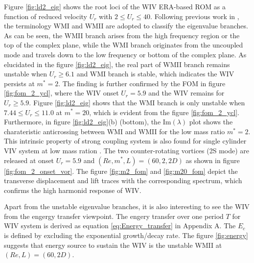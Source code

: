 Figure \ref{fig:ld2_eig} shows the root loci of the WIV ERA-based ROM as a function of reduced 
velocity $U_r$ with $2 \le U_r \le 40$. Following previous work in \cite{yao_jfm_1}, the terminology 
WMI and WMII are adopted to classify the eigenvalue branches. As can be seen, 
the WMII branch arises from the high frequency region or the top
of the complex plane, while the WMI branch originates from the uncoupled mode and travels down to the low frequency 
or bottom of the complex plane. 
As elucidated in the figure \ref{fig:ld2_eig}, 
the real part of WMII branch remains unstable when $U_r \ge 6.1$ and WMI branch is stable, 
which indicates the WIV persists at $m^*=2$. The finding is further 
confirmed by the FOM in figure \ref{fig:fom_2_ycl}, where the WIV onset $U_r=5.9$ and the WIV remains for $U_r \ge 5.9$. 
%
Figure \ref{fig:ld2_eig} shows that the WMI branch is only unstable when $7.44 \le U_r \le 11.0$ at $m^*=20$, which is evident 
from the figure \ref{fig:fom_2_ycl}. 
Furthermore, in figure \ref{fig:ld2_eig}(b) (bottom), the Im$(\lambda)$ plot shows the charateristic anticrossing between WMI and WMII for 
the low mass ratio $m^*=2$. This intrinsic property of strong coupling system is also found for single cylinder VIV system at 
low mass ration \cite{yao_jfm_1}. 
The two counter-rotating vortices (2S mode) are released at onset $U_r=5.9$ and $(Re,m^*,L)=(60,2,2D)$ 
as shown in figure \ref{fig:fom_2_onset_vor}. 
The figure \ref{fig:m2_fom} and \ref{fig:m20_fom} depict the transverse displacement and lift traces with the 
corresponding spectrum, which confirms the high harmonid response of WIV. 


Apart from the unstable eigenvalue branches, it is also interesting to see the WIV from the engergy transfer viewpoint.
The engery transfer over one period $T$ for WIV system is derived as equation \ref{eq:Energy_transfer} 
in Appendix A. The $E_c$ is defined by excluding the exponential growth/decay rate. The figure \ref{fig:energy} suggests 
that energy source to sustain the WIV is the unstable WMII at $(Re,L)=(60,2D)$. 
 
